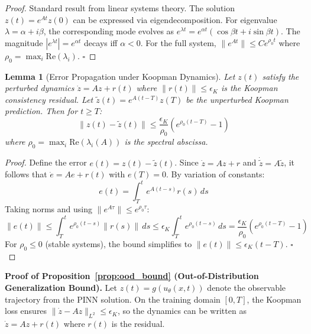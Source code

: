 \documentclass{article}
\newtheorem{lemma}{Lemma}
\theoremstyle{remark}
\begin{document}
\begin{proof}
Standard result from linear systems theory. The solution $z(t) = e^{At}z(0)$ can be expressed via eigendecomposition. For eigenvalue $\lambda = \alpha + i\beta$, the corresponding mode evolves as $e^{\lambda t} = e^{\alpha t}(\cos\beta t + i\sin\beta t)$. The magnitude $|e^{\lambda t}| = e^{\alpha t}$ decays iff $\alpha < 0$. For the full system, $\|e^{At}\| \leq Ce^{\rho_0 t}$ where $\rho_0 = \max_i \text{Re}(\lambda_i)$. $\square$
\end{proof}

\begin{lemma}[Error Propagation under Koopman Dynamics]
\label{lem:error_propagation}
Let $z(t)$ satisfy the perturbed dynamics $\dot{z} = Az + r(t)$ where $\|r(t)\| \leq \epsilon_K$ is the Koopman consistency residual. Let $\tilde{z}(t) = e^{A(t-T)}z(T)$ be the unperturbed Koopman prediction. Then for $t \geq T$:
\begin{equation}
\|z(t) - \tilde{z}(t)\| \leq \frac{\epsilon_K}{\rho_0}\left(e^{\rho_0(t-T)} - 1\right)
\end{equation}
where $\rho_0 = \max_i \text{Re}(\lambda_i(A))$ is the spectral abscissa.
\end{lemma}

\begin{proof}
Define the error $e(t) = z(t) - \tilde{z}(t)$. Since $\dot{z} = Az + r$ and $\dot{\tilde{z}} = A\tilde{z}$, it follows that $\dot{e} = Ae + r(t)$ with $e(T) = 0$. By variation of constants:
\begin{equation}
e(t) = \int_T^t e^{A(t-s)}r(s)\,ds
\end{equation}
Taking norms and using $\|e^{A\tau}\| \leq e^{\rho_0\tau}$:
\begin{equation}
\|e(t)\| \leq \int_T^t e^{\rho_0(t-s)}\|r(s)\|\,ds \leq \epsilon_K \int_T^t e^{\rho_0(t-s)}\,ds = \frac{\epsilon_K}{\rho_0}\left(e^{\rho_0(t-T)} - 1\right)
\end{equation}
For $\rho_0 \leq 0$ (stable systems), the bound simplifies to $\|e(t)\| \leq \epsilon_K(t-T)$. $\square$
\end{proof}

\textbf{Proof of Proposition~\ref{prop:ood_bound} (Out-of-Distribution Generalization Bound).}
Let $z(t) = g(u_\theta(x,t))$ denote the observable trajectory from the PINN solution. On the training domain $[0,T]$, the Koopman loss ensures $\|\dot{z} - Az\|_{L^2} \leq \epsilon_K$, so the dynamics can be written as $\dot{z} = Az + r(t)$ where $r(t)$ is the residual.
\end{document}
